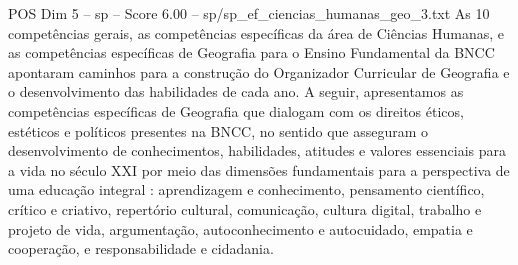 \begin{textsample}{POS Dim 5 – sp – Score 6.00 – sp/sp\_ef\_ciencias\_humanas\_geo\_3.txt}
As 10 competências gerais, as competências específicas da área de Ciências Humanas, e as competências específicas de Geografia para o Ensino Fundamental da BNCC apontaram caminhos para a construção do Organizador Curricular de Geografia e o desenvolvimento das habilidades de cada ano.
A seguir, apresentamos as competências específicas de Geografia que dialogam com os direitos éticos, estéticos e políticos presentes na BNCC, no sentido que asseguram o desenvolvimento de conhecimentos, habilidades, atitudes e valores essenciais para a vida no século XXI por meio das dimensões fundamentais para a perspectiva de uma educação integral : aprendizagem e conhecimento, pensamento científico, crítico e criativo, repertório cultural, comunicação, cultura digital, trabalho e projeto de vida, argumentação, autoconhecimento e autocuidado, empatia e cooperação, e responsabilidade e cidadania.

\end{textsample}

